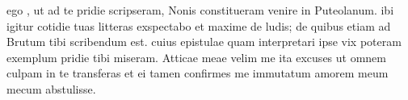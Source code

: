 


 ego , ut ad te pridie scripseram, Nonis constitueram venire in Puteolanum. ibi igitur cotidie tuas litteras exspectabo et maxime de ludis; de quibus etiam ad Brutum tibi scribendum est. cuius epistulae quam interpretari ipse vix poteram exemplum pridie tibi miseram. Atticae meae velim me ita excuses ut omnem culpam in te transferas et ei tamen confirmes me immutatum amorem meum mecum abstulisse.
